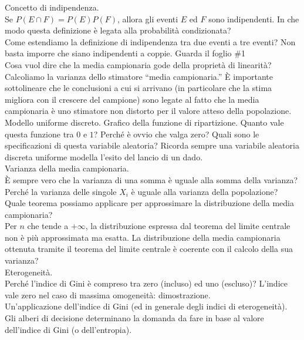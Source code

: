 \documentclass{article}
\begin{document}
    Concetto di indipendenza. \\
    Se $ P(E \cap F) = P(E)P(F) $, allora gli eventi $ E $ ed $ F $ sono indipendenti. In che modo questa definizione è legata alla probabilità condizionata? \\
    Come estendiamo la definizione di indipendenza tra due eventi a tre eventi? Non basta imporre che siano indipendenti a coppie. Guarda il foglio \#1 \\
    Cosa vuol dire che la media campionaria gode della proprietà di linearità? \\
    Calcoliamo la varianza dello stimatore “media campionaria.” È importante sottolineare che le conclusioni a cui si arrivano (in particolare che la stima migliora con il
    crescere del campione) sono legate al fatto che la media campionaria è uno stimatore non distorto per il valore atteso della popolazione. \\
    Modello uniforme discreto. Grafico della funzione di ripartizione. Quanto vale questa funzione tra $ 0 $ e $ 1 $? Perché è ovvio che valga zero? Quali sono le specificazioni
    di questa variabile aleatoria? Ricorda sempre una variabile aleatoria discreta uniforme modella l'esito del lancio di un dado. \\
    
    Varianza della media campionaria. \\
    È sempre vero che la varianza di una somma è uguale alla somma della varianza? Perché la varianza delle singole $ X_i $ è uguale alla varianza della popolazione? \\
    Quale teorema possiamo applicare per approssimare la distribuzione della media campionaria? \\
    Per $ n $ che tende a $ + \infty $, la distribuzione espressa dal teorema del limite centrale non è più approssimata ma esatta. La distribuzione della media campionaria
    ottenuta tramite il teorema del limite centrale è coerente con il calcolo della sua varianza? \\
    Eterogeneità. \\
    Perché l'indice di Gini è compreso tra zero (incluso) ed uno (escluso)? L'indice vale zero nel caso di massima omogeneità: dimostrazione. \\
    Un'applicazione dell'indice di Gini (ed in generale degli indici di eterogeneità). Gli alberi di decisione determinano la domanda da fare in base al valore dell'indice di
    Gini (o dell'entropia). \\
    
\end{document}
